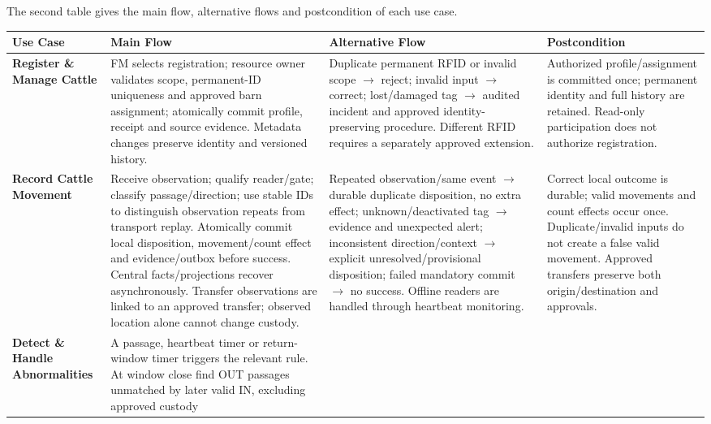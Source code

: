 The second table gives the main flow, alternative flows and
postcondition of each use case.

{\small
\begin{longtable}[]{|>{\raggedright\arraybackslash}p{}|>{\raggedright\arraybackslash}p{}|>{\raggedright\arraybackslash}p{}|>{\raggedright\arraybackslash}p{}|}
\hline
\textbf{Use Case} & \textbf{Main Flow} & \textbf{Alternative Flow} & \textbf{Postcondition} \\ \hline
\endhead
\textbf{Register \& Manage Cattle} & FM selects registration; resource
owner validates scope, permanent-ID uniqueness and approved barn
assignment; atomically commit profile, receipt and source evidence.
Metadata changes preserve identity and versioned history. & Duplicate
permanent RFID or invalid scope $\rightarrow$ reject; invalid input
$\rightarrow$ correct; lost/damaged tag $\rightarrow$ audited
incident and approved identity-preserving procedure. Different RFID
requires a separately approved extension. & Authorized
profile/assignment is committed once; permanent identity and full
history are retained. Read-only participation does not authorize
registration. \\ \hline
\textbf{Record Cattle Movement} & Receive observation; qualify
reader/gate; classify passage/direction; use stable IDs to distinguish
observation repeats from transport replay. Atomically commit local
disposition, movement/count effect and evidence/outbox before success.
Central facts/projections recover asynchronously. Transfer observations
are linked to an approved transfer; observed location alone cannot
change custody. & Repeated observation/same event $\rightarrow$
durable duplicate disposition, no extra effect; unknown/deactivated tag
$\rightarrow$ evidence and unexpected alert; inconsistent
direction/context $\rightarrow$ explicit unresolved/provisional
disposition; failed mandatory commit $\rightarrow$ no success. Offline
readers are handled through heartbeat monitoring. & Correct local
outcome is durable; valid movements and count effects occur once.
Duplicate/invalid inputs do not create a false valid movement. Approved
transfers preserve both origin/destination and approvals. \\ \hline
\textbf{Detect \& Handle Abnormalities} & A passage, heartbeat timer or
return-window timer triggers the relevant rule. At window close find OUT
passages unmatched by later valid IN, excluding approved custody

\end{longtable}}
